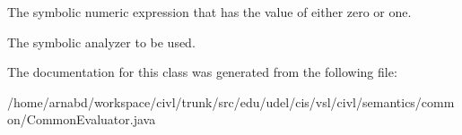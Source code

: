 The symbolic numeric expression that has the value of either zero or one. 

The symbolic analyzer to be used. 

The documentation for this class was generated from the following file\+:\begin{DoxyCompactItemize}
\item 
/home/arnabd/workspace/civl/trunk/src/edu/udel/cis/vsl/civl/semantics/common/Common\+Evaluator.\+java\end{DoxyCompactItemize}
